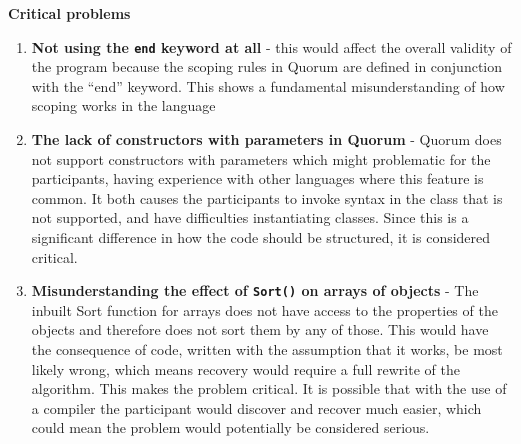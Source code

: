 \textbf{Critical problems}
\begin{enumerate}
\item \textbf{Not using the \lstinline!end! keyword at all} - this would affect the overall validity of the program because the scoping rules in Quorum are defined in conjunction with the “end” keyword. This shows a fundamental misunderstanding of how scoping works in the language
\item \textbf{The lack of constructors with parameters in Quorum} - Quorum does not support constructors with parameters which might problematic for the participants, having experience with other languages where this feature is common. It both causes the participants to invoke syntax in the class that is not supported, and have difficulties instantiating classes. Since this is a significant difference in how the code should be structured, it is considered critical.
\item \textbf{Misunderstanding the effect of \lstinline!Sort()! on arrays of objects} - The inbuilt Sort function for arrays does not have access to the properties of the objects and therefore does not sort them by any of those. This would have the consequence of code, written with the assumption that it works, be most likely wrong, which means recovery would require a full rewrite of the algorithm. This makes the problem critical. It is possible that with the use of a compiler the participant would discover and recover much easier, which could mean the problem would potentially be considered serious.
\end{enumerate}

